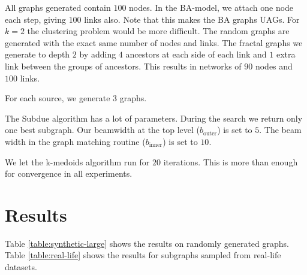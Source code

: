 \documentclass{article}
\begin{document}
All graphs generated contain $100$ nodes. In the BA-model, we attach one node each step, giving $100$ links also. Note that this makes the BA graphs UAGs. For $k = 2$ the clustering problem would be more difficult. The random graphs are generated with the exact same number of nodes and links. The fractal graphs we generate to depth $2$ by adding $4$ ancestors at each side of each link and $1$ extra link between the groups of ancestors. This results in networks of $90$ nodes and $100$ links.

For each source, we generate $3$ graphs.

The Subdue algorithm has a lot of parameters. During the search we return only one best subgraph. Our beamwidth at the top level ($b_{\mbox{outer}}$) is set to $5$. The beam width in the graph matching routine ($b_{\mbox{inner}}$) is set to $10$.  

We let the k-medoids algorithm run for $20$ iterations. This is more than enough for convergence in all experiments. 

\section*{Results}

Table \ref{table:synthetic-large} shows the results on randomly generated graphs. Table \ref{table:real-life} shows the results for subgraphs sampled from real-life datasets.  
\end{document}
